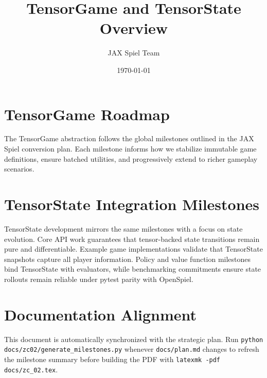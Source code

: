 \documentclass{article}
\title{TensorGame and TensorState Overview}
\author{JAX Spiel Team}
\date{\today}
\begin{document}
\maketitle

\section{TensorGame Roadmap}
The TensorGame abstraction follows the global milestones outlined in the JAX Spiel conversion plan. Each milestone informs how we
stabilize immutable game definitions, ensure batched utilities, and progressively extend to richer gameplay scenarios.


\section{TensorState Integration Milestones}
TensorState development mirrors the same milestones with a focus on state evolution. Core API work guarantees that tensor-backed
state transitions remain pure and differentiable. Example game implementations validate that TensorState snapshots capture all
player information. Policy and value function milestones bind TensorState with evaluators, while benchmarking commitments ensure
state rollouts remain reliable under pytest parity with OpenSpiel.

\section{Documentation Alignment}
This document is automatically synchronized with the strategic plan. Run
\texttt{python docs/zc02/generate\_milestones.py} whenever \texttt{docs/plan.md} changes to refresh the milestone summary before
building the PDF with \texttt{latexmk -pdf docs/zc\_02.tex}.
\end{document}
